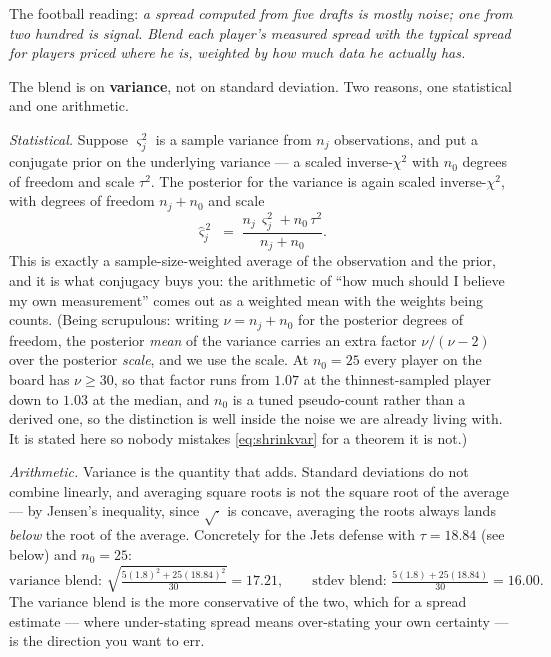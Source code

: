 \documentclass[10pt,a4paper]{article}
\theoremstyle{plain}
\theoremstyle{definition}
\theoremstyle{remark}
\begin{document}
The football reading: \emph{a spread computed from five drafts is mostly noise; one from
two hundred is signal. Blend each player's measured spread with the typical spread for
players priced where he is, weighted by how much data he actually has.}

The blend is on \textbf{variance}, not on standard deviation. Two reasons, one
statistical and one arithmetic.

\emph{Statistical.} Suppose $\varsigma_j^2$ is a sample variance from $n_j$
observations, and put a conjugate prior on the underlying variance --- a scaled
inverse-$\chi^2$ with $n_0$ degrees of freedom and scale $\tau^2$. The posterior for
the variance is again scaled inverse-$\chi^2$, with degrees of freedom $n_j + n_0$ and
scale
\begin{equation}
\hat\varsigma_j^{\,2} \;=\; \frac{n_j\,\varsigma_j^2 + n_0\,\tau^2}{n_j + n_0}.
\label{eq:shrinkvar}
\end{equation}
This is exactly a sample-size-weighted average of the observation and the prior, and it
is what conjugacy buys you: the arithmetic of ``how much should I believe my own
measurement'' comes out as a weighted mean with the weights being counts. (Being
scrupulous: writing $\nu = n_j + n_0$ for the posterior degrees of freedom, the posterior
\emph{mean} of the variance carries an extra factor $\nu/(\nu-2)$ over the posterior
\emph{scale}, and we use the scale. At $n_0 = 25$ every player on the board has
$\nu \ge 30$, so that factor runs from $1.07$ at the thinnest-sampled player down to
$1.03$ at the median, and $n_0$ is a
tuned pseudo-count rather than a derived one, so the distinction is well inside the
noise we are already living with. It is stated here so nobody mistakes
\eqref{eq:shrinkvar} for a theorem it is not.)

\emph{Arithmetic.} Variance is the quantity that adds. Standard deviations do not
combine linearly, and averaging square roots is not the square root of the average ---
by Jensen's inequality, since $\sqrt{\cdot}$ is concave, averaging the roots always
lands \emph{below} the root of the average. Concretely for the Jets defense with
$\tau = 18.84$ (see below) and $n_0 = 25$:
\[
\text{variance blend: } \sqrt{\tfrac{5(1.8)^2 + 25(18.84)^2}{30}} = 17.21,
\qquad
\text{stdev blend: } \tfrac{5(1.8) + 25(18.84)}{30} = 16.00.
\]
The variance blend is the more conservative of the two, which for a spread estimate ---
where under-stating spread means over-stating your own certainty --- is the direction
you want to err.
\end{document}
